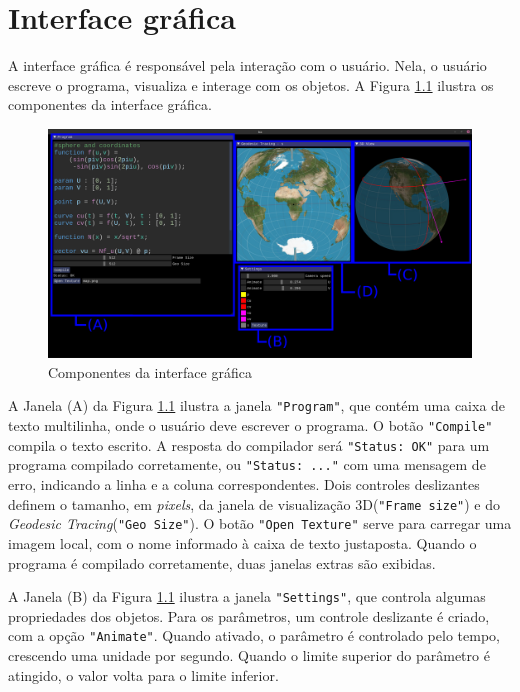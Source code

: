 \chapter{Interface gráfica}
\label{interface}

A interface gráfica é responsável pela interação com o usuário.
Nela, o usuário escreve o programa, visualiza e interage com os objetos.
A Figura \ref{img:comp} ilustra os componentes da interface gráfica.

\begin{figure}[!ht]
    \centering
    \includegraphics[width=\linewidth]{comp.png}
    \caption{Componentes da interface gráfica}
    \label{img:comp}
\end{figure}

A Janela (A) da Figura \ref{img:comp} ilustra a janela \texttt{"Program"}, que contém uma
caixa de texto multilinha, onde o usuário deve escrever o programa.
O botão \texttt{"Compile"} compila o texto escrito.
A resposta do compilador será \texttt{"Status: OK"} para um programa compilado 
corretamente, ou \texttt{"Status: ..."} com uma mensagem de erro, indicando a
linha e a coluna correspondentes.
Dois controles deslizantes definem o tamanho, em \textit{pixels}, da janela
de visualização 3D(\texttt{"Frame size"}) e do \textit{Geodesic Tracing}(\texttt{"Geo Size"}).
O botão \texttt{"Open Texture"} serve para carregar uma imagem local,
com o nome informado à caixa de texto justaposta.
Quando o programa é compilado corretamente, duas janelas extras são exibidas.

A Janela (B) da Figura \ref{img:comp} ilustra a janela \texttt{"Settings"},
que controla algumas propriedades dos objetos.
Para os parâmetros, um controle deslizante é criado, com a opção \texttt{"Animate"}.
Quando ativado, o parâmetro é controlado pelo tempo,
crescendo uma unidade por segundo.
Quando o limite superior do parâmetro é atingido,
o valor volta para o limite inferior.


